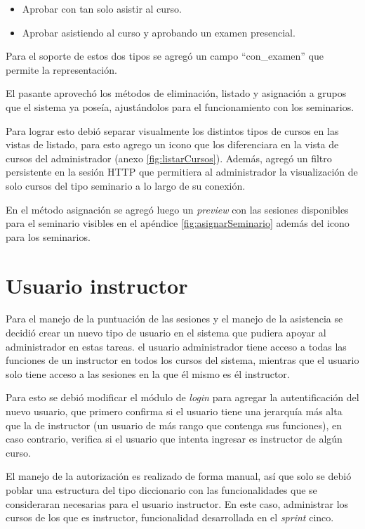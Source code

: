 	\begin{itemize}
		\item Aprobar con tan solo asistir al curso.
		\item Aprobar asistiendo al curso y aprobando un examen presencial.
	\end{itemize}

	Para el soporte de estos dos tipos se agregó un campo ``con\_examen'' que permite la representación.

	El pasante aprovechó los métodos de eliminación, listado y asignación a grupos que el sistema ya poseía, ajustándolos para el funcionamiento con los seminarios. 

	Para lograr esto debió separar visualmente los distintos tipos de cursos en las vistas de listado, para esto agrego un icono que los diferenciara en la vista de cursos del administrador (anexo \ref{fig:listarCursos}). Además, agregó un filtro persistente en la sesión HTTP que permitiera al administrador la visualización de solo cursos del tipo seminario a lo largo de su conexión.

	En el método asignación se agregó luego un \emph{preview} con las sesiones disponibles para el seminario visibles en el apéndice \ref{fig:asignarSeminario} además del icono para los seminarios. 


	\section{Usuario instructor} %
	\label{sec:usuario_instructor}
	
	Para el manejo de la puntuación de las sesiones y el manejo de la asistencia se decidió crear un nuevo tipo de usuario en el sistema que pudiera apoyar al administrador en estas tareas. el usuario administrador tiene acceso a todas las funciones de un instructor en todos los cursos del sistema, mientras que el usuario solo tiene acceso a las sesiones en la que él mismo es él instructor.

	Para esto se debió modificar el módulo de \emph{login} para agregar la autentificación del nuevo usuario, que primero confirma si el usuario tiene una jerarquía más alta que la de instructor (un usuario de más rango que contenga sus funciones), en caso contrario, verifica si el usuario que intenta ingresar es instructor de algún curso.

	El manejo de la autorización es realizado de forma manual, así que solo se debió poblar una estructura del tipo diccionario con las funcionalidades que se consideraran necesarias para el usuario instructor. En este caso, administrar los cursos de los que es instructor, funcionalidad desarrollada en el \emph{sprint} cinco.
	

